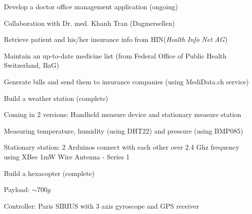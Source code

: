 

\begin{cventries}

\cventry
{} %
{Develop a doctor office management application (ongoing)} %
{} %
{} %
{\vspace{-12pt}
	\begin{cvitems} %
		\item {Collaboration with Dr. med. Khanh Tran (Dagmersellen)}
		\item {Retrieve patient and his/her insurance info from HIN(\textit{Health Info Net AG})}
		\item {Maintain an up-to-date medicine list (from Federal Office of Public Health Switzerland, BaG)}
		\item {Generate bills and send them to insurance companies (using MediData.ch service)}
	\end{cvitems}
}

\cventry
{} %
{Build a weather station (complete)} %
{} %
{} %
{\vspace{-12pt}
	\begin{cvitems} %
		\item {Coming in 2 versions: Handheld measure device and stationary measure station}
		\item {Measuring temperature, humidity (using DHT22) and pressure (using BMP085)}
		\item {Stationary station: 2 Arduinos connect with each other over 2.4 Ghz frequency using XBee 1mW Wire Antenna - Series 1}
	\end{cvitems}
}

  \cventry
    {} %
    {Build a hexacopter (complete)} %
    {} %
    {} %
    {\vspace{-12pt}
      \begin{cvitems} %
        \item {Payload: $ \sim 700g$}
        \item {Controller: Paris SIRIUS with 3 axis gyroscope and GPS receiver}
      \end{cvitems}
    }


\end{cventries}
